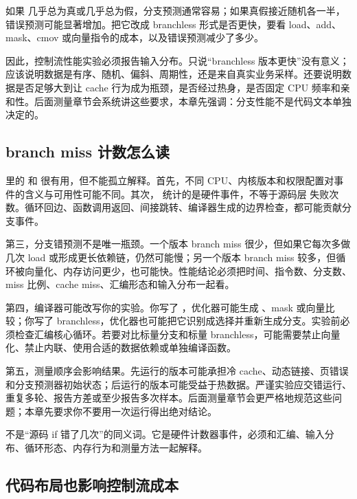 如果  几乎总为真或几乎总为假，分支预测通常容易；如果真假接近随机各一半，错误预测可能显著增加。把它改成 branchless 形式是否更快，要看 load、add、mask、cmov 或向量指令的成本，以及错误预测减少了多少。

因此，控制流性能实验必须报告输入分布。只说“branchless 版本更快”没有意义；应该说明数据是有序、随机、偏斜、周期性，还是来自真实业务采样。还要说明数据是否足够大到让 cache 行为成为瓶颈，是否经过热身，是否固定 CPU 频率和亲和性。后面测量章节会系统讲这些要求，本章先强调：分支性能不是代码文本单独决定的。

\subsection{branch miss 计数怎么读}

 里的  和  很有用，但不能孤立解释。首先，不同 CPU、内核版本和权限配置对事件的含义与可用性可能不同。其次， 统计的是硬件事件，不等于源码层  失败次数。循环回边、函数调用返回、间接跳转、编译器生成的边界检查，都可能贡献分支事件。

第三，分支错预测不是唯一瓶颈。一个版本 branch miss 很少，但如果它每次多做几次 load 或形成更长依赖链，仍然可能慢；另一个版本 branch miss 较多，但循环被向量化、内存访问更少，也可能快。性能结论必须把时间、指令数、分支数、miss 比例、cache miss、汇编形态和输入分布一起看。

第四，编译器可能改写你的实验。你写了 ，优化器可能生成 、mask 或向量比较；你写了 branchless，优化器也可能把它识别成选择并重新生成分支。实验前必须检查汇编核心循环。若要对比标量分支和标量 branchless，可能需要禁止向量化、禁止内联、使用合适的数据依赖或单独编译函数。

第五，测量顺序会影响结果。先运行的版本可能承担冷 cache、动态链接、页错误和分支预测器初始状态；后运行的版本可能受益于热数据。严谨实验应交错运行、重复多轮、报告方差或至少报告多次样本。后面测量章节会更严格地规范这些问题；本章先要求你不要用一次运行得出绝对结论。

\begin{warningbox}
 不是“源码 if 错了几次”的同义词。它是硬件计数器事件，必须和汇编、输入分布、循环形态、内存行为和测量方法一起解释。
\end{warningbox}

\subsection{代码布局也影响控制流成本}

